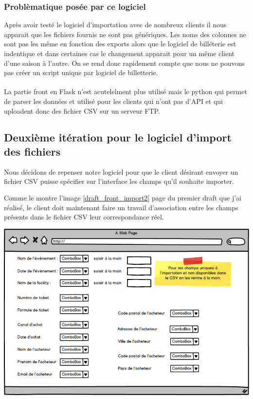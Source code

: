 \subsubsection{Problèmatique posée par ce logiciel}
Après avoir testé le logiciel d'importation avec de nombreux clients il nous apparait que les fichiers fournis ne sont pas génériques. 
Les noms des colonnes ne sont pas les même en fonction des exports alors que le logiciel de billéterie est indentique et dans certaines cas le changement apparait pour un même client d'une saison à l'autre. 
On se rend donc rapidement compte que nous ne pouvons pas créer un script unique par logiciel de billetterie.
\\ \\
La partie front en Flask n'est acutelelment plus utilisé mais le python qui permet de parser les données et utilisé pour les clients qui n'ont pas d'API et qui uploadent donc des fichier CSV sur un serveur FTP. 


\subsection{Deuxième itération pour le logiciel d'import des fichiers}
Nous décidons de repenser notre logiciel pour que le client désirant envoyer un fichier CSV puisse spécifier sur l'interface les champs qu'il souhaite importer.

Comme le montre l'image \ref{draft_front_import2} page \pageref{draft_front_import2} du premier draft que j'ai réalisé, le client doit maintenant faire un travail d'association entre les champs présents dans le fichier CSV leur correspondance réel. 

\begin{center}
\includegraphics[scale=0.55]{images/front3.png}
\label{draft_front_import2}
\end{center}


